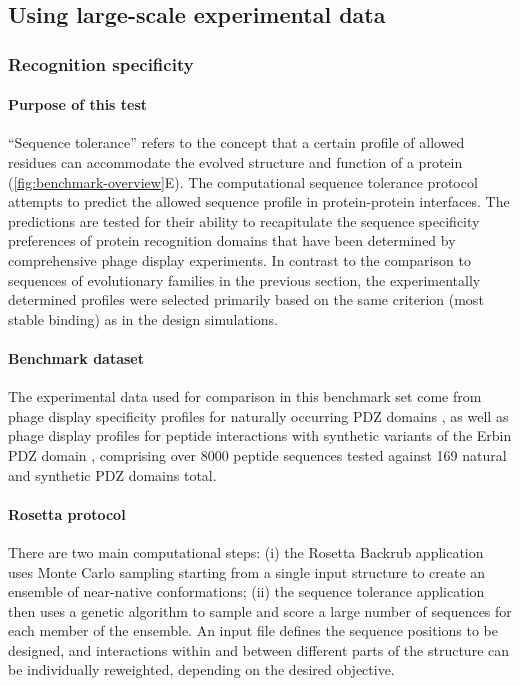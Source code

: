 \subsection{Using large-scale experimental data}

\subsubsection{Recognition specificity}

\paragraph{Purpose of this test}

``Sequence tolerance'' refers to the concept that a certain profile of allowed residues can accommodate the evolved structure and function of a protein (\cref{fig:benchmark-overview}E). The computational sequence tolerance protocol attempts to predict the allowed sequence profile in protein-protein interfaces. The predictions are tested for their ability to recapitulate the sequence specificity preferences of protein recognition domains that have been determined by comprehensive phage display experiments. In contrast to the comparison to sequences of evolutionary families in the previous section, the experimentally determined profiles were selected primarily based on the same criterion (most stable binding) as in the design simulations.

\paragraph{Benchmark dataset}
The experimental data used for comparison in this benchmark set come from phage display specificity profiles for naturally occurring PDZ domains \cite{tonikian_specificity_2008}, as well as phage display profiles for peptide interactions with synthetic variants of the Erbin PDZ domain \cite{tonikian_specificity_2008,ernst_rapid_2009}, comprising over 8000 peptide sequences tested against 169 natural and synthetic PDZ domains total.

\paragraph{Rosetta protocol}
There are two main computational steps: (i) the Rosetta Backrub application \cite{smith_backrub-like_2008} uses Monte Carlo sampling starting from a single input structure to create an ensemble of near-native conformations; (ii) the sequence tolerance application \cite{smith_predicting_2011,smith_structure-based_2010} then uses a genetic algorithm to sample and score a large number of sequences for each member of the ensemble. An input file defines the sequence positions to be designed, and interactions within and between different parts of the structure can be individually reweighted, depending on the desired objective.

